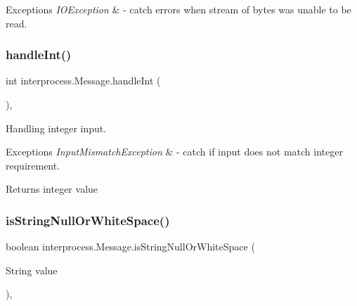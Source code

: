 \begin{DoxyExceptions}{Exceptions}
{\em I\+O\+Exception} & -\/ catch errors when stream of bytes was unable to be read. \\
\hline
\end{DoxyExceptions}
\mbox{\label{classinterprocess_1_1_message_a594aec63ced8dc0b7440ceae46e71c52}} 
\subsubsection{\texorpdfstring{handle\+Int()}{handleInt()}}
{\footnotesize\ttfamily int interprocess.\+Message.\+handle\+Int (\begin{DoxyParamCaption}{ }\end{DoxyParamCaption})\hspace{0.3cm}{\ttfamily [inline]}, {\ttfamily [private]}}

Handling integer input. 
\begin{DoxyExceptions}{Exceptions}
{\em Input\+Mismatch\+Exception} & -\/ catch if input does not match integer requirement. \\
\hline
\end{DoxyExceptions}
\begin{DoxyReturn}{Returns}
integer value 
\end{DoxyReturn}
\mbox{\label{classinterprocess_1_1_message_a67f6da8b5552745401b1ab20f3f8a035}} 
\subsubsection{\texorpdfstring{is\+String\+Null\+Or\+White\+Space()}{isStringNullOrWhiteSpace()}}
{\footnotesize\ttfamily boolean interprocess.\+Message.\+is\+String\+Null\+Or\+White\+Space (\begin{DoxyParamCaption}\item[{String}]{value }\end{DoxyParamCaption})\hspace{0.3cm}{\ttfamily [inline]}, {\ttfamily [private]}}

